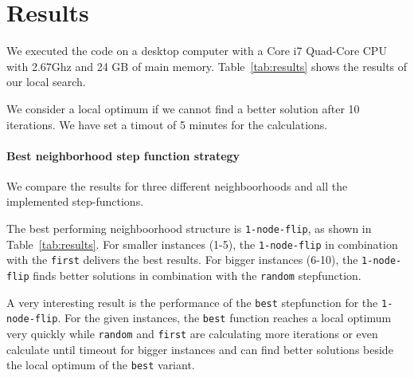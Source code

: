 \documentclass{scrartcl}
\begin{document}


\section{Results}

We executed the code on a desktop computer with a Core i7 Quad-Core
CPU with 2.67Ghz and 24 GB of main memory. Table~\ref{tab:results}
shows the results of our local search. 

We consider a local optimum if we cannot find a better solution after 10 iterations.
We have set a timout of 5 minutes for the calculations.

\paragraph{Best neighborhood step function strategy}

We compare the results for three different neighboorhoods and all the
implemented step-functions.

The best performing neighboorhood structure is \texttt{1-node-flip}, as
shown in Table~\ref{tab:results}.
For smaller instances (1-5), the \texttt{1-node-flip} in combination with 
the \texttt{first} delivers the best results.
For bigger instances (6-10), the \texttt{1-node-flip}  finds 
better solutions in combination with the \texttt{random} stepfunction.



A very interesting result is the performance of the \texttt{best} stepfunction
for the \texttt{1-node-flip}. For the given instances, the \texttt{best} function
reaches a local optimum very quickly while \texttt{random} and \texttt{first} 
are calculating more iterations or even calculate until timeout for bigger
instances and can find better solutions beside the local optimum of the \texttt{best} 
variant.
%
\end{document}
